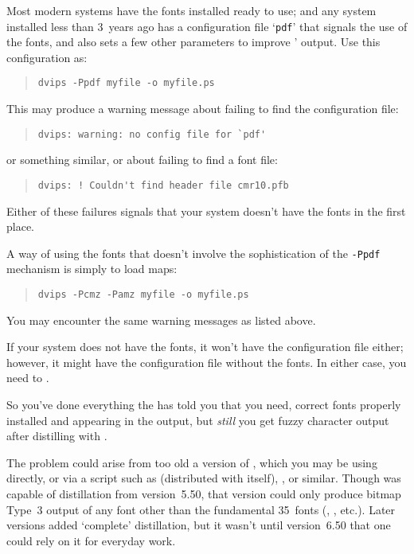 Most modern systems have the fonts installed ready to use; and any
system installed less than 3~years ago has a 
configuration file `\texttt{pdf}' that signals the use of the
 fonts, and also sets a few other parameters to improve
' output.  Use this configuration as:
\begin{quote}
\begin{verbatim}
dvips -Ppdf myfile -o myfile.ps
\end{verbatim}
\end{quote}
This may produce a warning message about failing to find the
configuration file:
\begin{quote}
\begin{verbatim}
dvips: warning: no config file for `pdf'
\end{verbatim}
\end{quote}
or something similar, or about failing to find a font file:
\begin{quote}
\begin{verbatim}
dvips: ! Couldn't find header file cmr10.pfb
\end{verbatim}
\end{quote}
Either of these failures signals that your
system doesn't have the fonts in the first place.

A way of using the fonts that doesn't involve the sophistication of
the \texttt{-Ppdf} mechanism is simply to load maps:
\begin{quote}
\begin{verbatim}
dvips -Pcmz -Pamz myfile -o myfile.ps
\end{verbatim}
\end{quote}
You may encounter the same warning messages as listed above.

If your system does not have the fonts, it won't have the
configuration file either; however, it might have the configuration
file without the fonts.  In either case, you need to
.



So you've done everything the  has told you that you need,
correct fonts properly installed and appearing in the 
output, but \emph{still} you get fuzzy character output after
distilling with \href{http://www.ghostscript.com/}{}.

The problem could arise from too old a version of
\href{http://www.ghostscript.com/}{}, which you
may be using directly, or via a
script such as  (distributed with
 itself), , or similar.
Though  was capable of distillation from
version~5.50, that version could only produce bitmap Type~3 output of
any font other than the fundamental 35~fonts (,
, etc.).  Later versions added `complete'
distillation, but it wasn't until version~6.50 that one could rely on
it for everyday work.

